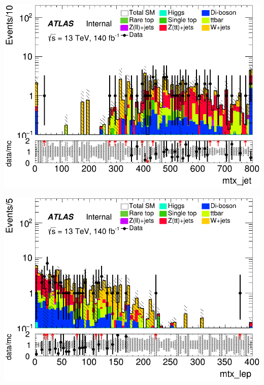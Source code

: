 \documentclass[usenames,dvipsnames]{beamer}
\begin{document}
\begin{frame}
    \begin{minipage}{0.32\textwidth}
        \centering
        \includegraphics[width=\textwidth]{graphics/HHH_met/HHH_met_mtx_jet.png}
    \end{minipage}
        \hfill
    \begin{minipage}{0.32\textwidth}
        \centering
        \includegraphics[width=\textwidth]{graphics/HHH_met/HHH_met_mtx_lep.png}
    \end{minipage}
    \hfill
    \begin{minipage}{0.32\textwidth}
        \centering

\end{minipage}
\end{frame}
\end{document}

